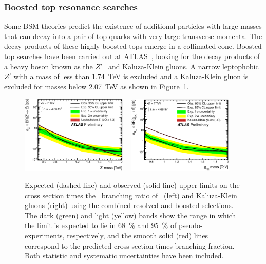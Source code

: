 \subsubsection{Boosted top resonance searches}

Some BSM theories predict the existence of additional particles with large masses that can decay into a pair of top quarks with very large transverse momenta. The decay products of these highly boosted tops emerge in a collimated cone. Boosted top searches have been carried out at ATLAS~\cite{Boosted:ATLASExclusion7TeV}, looking for the decay products of a heavy boson known as the $Z'$~\cite{TopQuark:TC2,TopQuark:TC22} and Kaluza-Klein gluons. A narrow leptophobic $Z'$ with a mass of less than \SI{1.74}{\TeV} is excluded and a Kaluza-Klein gluon is excluded for masses below \SI{2.07}{\TeV} as shown in Figure~\ref{fig:BoostedLimits}.

\begin{figure}[htbp]
  \centering
  \includegraphics[width=0.45\textwidth]{PartTopQuark/Plots/fig_10e.eps}
~%
  \includegraphics[width=0.45\textwidth]{PartTopQuark/Plots/fig_10f.eps}
  \caption{Expected (dashed line) and observed (solid line) upper limits on the cross section times the \ttbar\ branching ratio of \Zprime\ (left) and Kaluza-Klein gluons (right) using the combined resolved and boosted selections. The dark (green) and light (yellow) bands show the range in which the limit is expected to lie in \SI{68}{\percent} and \SI{95}{\percent} of pseudo-experiments, respectively, and the smooth solid (red) lines correspond to the predicted cross section times branching fraction. Both statistic and systematic uncertainties have been included.}\label{fig:BoostedLimits}
\end{figure}


